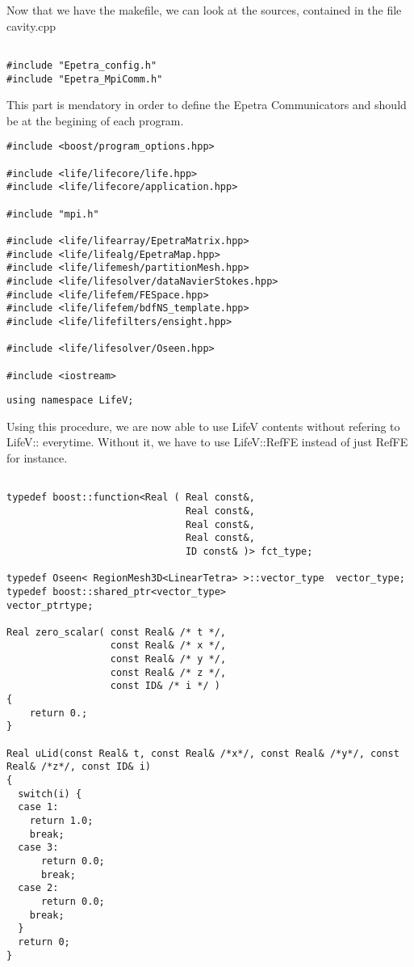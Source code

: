 Now that we have the makefile, we can look at the sources, contained in the file cavity.cpp


\begin{verbatim}

#include "Epetra_config.h"
#include "Epetra_MpiComm.h"

\end{verbatim}

This part is mendatory in order to define the Epetra Communicators and should be
at the begining of each program.


\begin{verbatim}
#include <boost/program_options.hpp>

#include <life/lifecore/life.hpp>
#include <life/lifecore/application.hpp>

#include "mpi.h"

#include <life/lifearray/EpetraMatrix.hpp>
#include <life/lifealg/EpetraMap.hpp>
#include <life/lifemesh/partitionMesh.hpp>
#include <life/lifesolver/dataNavierStokes.hpp>
#include <life/lifefem/FESpace.hpp>
#include <life/lifefem/bdfNS_template.hpp>
#include <life/lifefilters/ensight.hpp>

#include <life/lifesolver/Oseen.hpp>

#include <iostream>
\end{verbatim}



\begin{verbatim}
using namespace LifeV;
\end{verbatim}

Using this procedure, we are now able to use LifeV contents without refering to LifeV:: everytime.
Without it, we have to use LifeV::RefFE instead of just RefFE for instance.


\begin{verbatim}

typedef boost::function<Real ( Real const&,
                               Real const&,
                               Real const&,
                               Real const&,
                               ID const& )> fct_type;

typedef Oseen< RegionMesh3D<LinearTetra> >::vector_type  vector_type;
typedef boost::shared_ptr<vector_type>                   vector_ptrtype;

Real zero_scalar( const Real& /* t */,
                  const Real& /* x */,
                  const Real& /* y */,
                  const Real& /* z */,
                  const ID& /* i */ )
{
    return 0.;
}

Real uLid(const Real& t, const Real& /*x*/, const Real& /*y*/, const Real& /*z*/, const ID& i)
{
  switch(i) {
  case 1:
    return 1.0;
    break;
  case 3:
      return 0.0;
      break;
  case 2:
      return 0.0;
    break;
  }
  return 0;
}

\end{verbatim}

